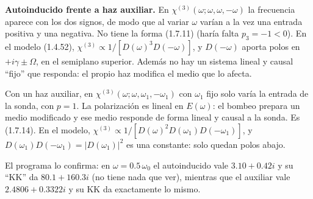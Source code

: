  \textbf{Autoinducido frente a haz auxiliar.} En $\chi^{(3)}(\omega;\omega,\omega,-\omega)$ la frecuencia aparece con los dos signos, de modo que al variar
$\omega$ varían a la vez una entrada positiva y una negativa. No tiene la forma (1.7.11) (haría falta $p_3=-1<0$). En el modelo (1.4.52),
$\chi^{(3)}\propto1/[D(\omega)^3D(-\omega)]$, y $D(-\omega)$ aporta polos en $+i\gamma\pm\Omega$, en el semiplano superior. Además no hay un sistema lineal y causal
``fijo'' que responda: el propio haz modifica el medio que lo afecta.

Con un haz auxiliar, en $\chi^{(3)}(\omega;\omega,\omega_1,-\omega_1)$ con $\omega_1$ fijo solo varía la entrada de la sonda, con $p=1$. La polarización es lineal
en $E(\omega)$: el bombeo prepara un medio modificado y ese medio responde de forma lineal y causal a la sonda. Es (1.7.14). En el modelo,
$\chi^{(3)}\propto1/[D(\omega)^2D(\omega_1)D(-\omega_1)]$, y $D(\omega_1)D(-\omega_1)=|D(\omega_1)|^2$ es una constante: solo quedan polos abajo.

El programa lo confirma: en $\omega=0.5\,\omega_0$ el autoinducido vale $3.10+0.42i$ y su ``KK'' da $80.1+160.3i$ (no tiene nada que ver), mientras que el auxiliar vale
$2.4806+0.3322i$ y su KK da exactamente lo mismo.



\label{sol:38}

